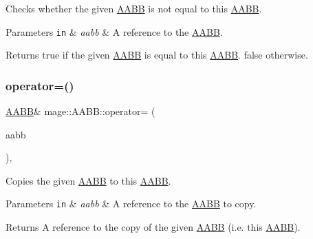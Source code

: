 Checks whether the given \hyperlink{classmage_1_1_a_a_b_b}{A\+A\+BB} is not equal to this \hyperlink{classmage_1_1_a_a_b_b}{A\+A\+BB}.


\begin{DoxyParams}[1]{Parameters}
\mbox{\tt in}  & {\em aabb} & A reference to the \hyperlink{classmage_1_1_a_a_b_b}{A\+A\+BB}. \\
\hline
\end{DoxyParams}
\begin{DoxyReturn}{Returns}
{\ttfamily true} if the given \hyperlink{classmage_1_1_a_a_b_b}{A\+A\+BB} is equal to this \hyperlink{classmage_1_1_a_a_b_b}{A\+A\+BB}. {\ttfamily false} otherwise. 
\end{DoxyReturn}
\hypertarget{classmage_1_1_a_a_b_b_a11ba6858dfeaf17cc3e297385c925a8b}{}\label{classmage_1_1_a_a_b_b_a11ba6858dfeaf17cc3e297385c925a8b} 
\subsubsection{\texorpdfstring{operator=()}{operator=()}\hspace{0.1cm}{\footnotesize\ttfamily [1/2]}}
{\footnotesize\ttfamily \hyperlink{classmage_1_1_a_a_b_b}{A\+A\+BB}\& mage\+::\+A\+A\+B\+B\+::operator= (\begin{DoxyParamCaption}\item[{const \hyperlink{classmage_1_1_a_a_b_b}{A\+A\+BB} \&}]{aabb }\end{DoxyParamCaption})\hspace{0.3cm}{\ttfamily [default]}, {\ttfamily [noexcept]}}

Copies the given \hyperlink{classmage_1_1_a_a_b_b}{A\+A\+BB} to this \hyperlink{classmage_1_1_a_a_b_b}{A\+A\+BB}.


\begin{DoxyParams}[1]{Parameters}
\mbox{\tt in}  & {\em aabb} & A reference to the \hyperlink{classmage_1_1_a_a_b_b}{A\+A\+BB} to copy. \\
\hline
\end{DoxyParams}
\begin{DoxyReturn}{Returns}
A reference to the copy of the given \hyperlink{classmage_1_1_a_a_b_b}{A\+A\+BB} (i.\+e. this \hyperlink{classmage_1_1_a_a_b_b}{A\+A\+BB}). 
\end{DoxyReturn}
\hypertarget{classmage_1_1_a_a_b_b_acc54304ce3bde3ea3aa2b487f2d975b7}{}\label{classmage_1_1_a_a_b_b_acc54304ce3bde3ea3aa2b487f2d975b7} 
